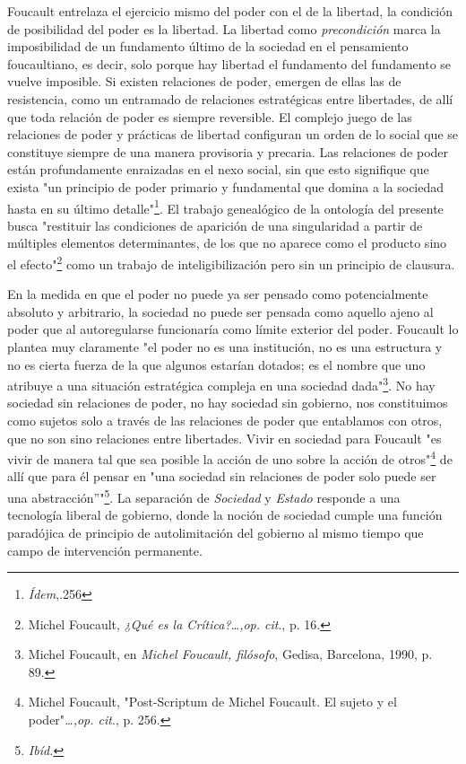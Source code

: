 \documentclass{book}
\begin{document}
Foucault entrelaza el ejercicio mismo del poder con el de la libertad,
la condición de posibilidad del poder es la libertad. La libertad como
\emph{precondición} marca la imposibilidad de un fundamento último de la
sociedad en el pensamiento foucaultiano, es decir, solo porque hay
libertad el fundamento del fundamento se vuelve imposible. Si existen
relaciones de poder, emergen de ellas las de resistencia, como un
entramado de relaciones estratégicas entre libertades, de allí que toda
relación de poder es siempre reversible. El complejo juego de las
relaciones de poder y prácticas de libertad configuran un orden de lo
social que se constituye siempre de una manera provisoria y precaria.
Las relaciones de poder están profundamente enraizadas en el nexo
social, sin que esto signifique que exista "un principio de poder
primario y fundamental que domina a la sociedad hasta en su último
detalle"\footnote{\emph{Ídem},.256}. El trabajo genealógico de la
ontología del presente busca "restituir las condiciones de aparición de
una singularidad a partir de múltiples elementos determinantes, de los
que no aparece como el producto sino el efecto"\footnote{Michel
  Foucault, \emph{¿Qué es la Crítica?\ldots,op. cit}., p. 16.} como un
trabajo de inteligibilización pero sin un principio de clausura.

En la medida en que el poder no puede ya ser pensado como potencialmente
absoluto y arbitrario, la sociedad no puede ser pensada como aquello
ajeno al poder que al autoregularse funcionaría como límite exterior del
poder. Foucault lo plantea muy claramente "el poder no es una
institución, no es una estructura y no es cierta fuerza de la que
algunos estarían dotados; es el nombre que uno atribuye a una situación
estratégica compleja en una sociedad dada"\footnote{Michel Foucault, en
  \emph{Michel Foucault, filósofo}, Gedisa, Barcelona, 1990, p. 89.}. No
hay sociedad sin relaciones de poder, no hay sociedad sin gobierno, nos
constituimos como sujetos solo a través de las relaciones de poder que
entablamos con otros, que no son sino relaciones entre libertades. Vivir
en sociedad para Foucault "es vivir de manera tal que sea posible la
acción de uno sobre la acción de otros"\footnote{Michel Foucault,
  "Post-Scriptum de Michel Foucault. El sujeto y el
  poder"\emph{\ldots,op. cit}., p. 256.} de allí que para él pensar en
"una sociedad sin relaciones de poder solo puede ser una
abstracción''"\footnote{\emph{Ibíd.}}. La separación de \emph{Sociedad}
y \emph{Estado} responde a una tecnología liberal de gobierno, donde la
noción de sociedad cumple una función paradójica de principio de
autolimitación del gobierno al mismo tiempo que campo de intervención
permanente.
\end{document}
